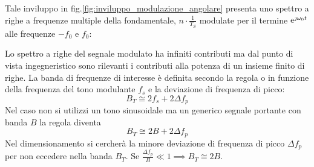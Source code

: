Tale inviluppo in fig.\ref{fig:inviluppo_modulazione_angolare} presenta uno spettro a righe a frequenze multiple della fondamentale, $n\cdot\frac{1}{T_S}$ modulate per il termine $\operatorname{e}^{\jmath\omega_0 t}$ alle frequenze $-f_0$ e $f_0$:
\begin{figure}[h!]
\centering{}\quad{}
\end{figure}

Lo spettro a righe del segnale modulato ha infiniti contributi ma dal punto di vista ingegneristico sono rilevanti i contributi alla potenza di un insieme finito di righe.
La banda di frequenze di interesse è definita secondo la regola o  in funzione della frequenza del tono modulante $f_s$ e la deviazione di frequenza di picco:
\begin{equation}B_T\cong 2f_s+2\Delta f_p\label{eq:Carson}\end{equation}
Nel caso non si utilizzi un tono sinusoidale ma un generico segnale portante con banda $B$ la regola diventa
\begin{equation}B_T\cong 2B+2\Delta f_p\label{eq:Carson_generico}\end{equation}
Nel dimensionamento si cercherà la minore deviazione di frequenza di picco $\Delta f_p$ per non eccedere nella banda $B_T$. Se $\frac{\Delta f_p}{B}\ll 1\implies B_T\cong 2B$.

